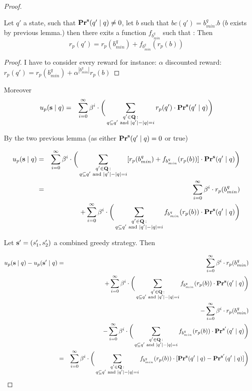 \begin{proof}
\begin{mylem}
	Let $q'$ a state, such that $\mathbf{Pr}^{\mathbf{s}}(q' \mid q) \neq 0$, let $b$ such that $bc(q') = b^q_{min}.b$ ($b$ exists by previous lemma.) then there exits a function $f_{b^q_{min}}$ such that :
	Then  $$r_p(q') = r_p(b^q_{min}) + f_{b^q_{min}}(r_p(b))$$
\end{mylem}
\begin{proof}
	I have to consider every reward for instance:  $\alpha$ discounted reward: 
	$r_p(q') = r_p(b^q_{min}) + \alpha^{|b^q_{min}|}r_p(b)$
\end{proof}

Moreover
\begin{eqnarray*}
	u_p(\mathbf{s} \mid q) & = & \sum_{i=0}^{\infty}\beta^{i} \cdot  \bigg(\sum_{\substack{q' \in \mathbf{Q} \,: \\ q \subseteq q' \text{ {\rm and} } |q'| - |q| = i}} r_p(q') \cdot 
	\mathbf{Pr}^{\mathbf{s}}(q' \mid q)\bigg)
\end{eqnarray*}

By the two previous lemma (as either $\mathbf{Pr}^{\mathbf{s}}(q' \mid q) = 0$ or true) 

\begin{eqnarray*}
	u_p(\mathbf{s} \mid q) & = & \sum_{i=0}^{\infty}\beta^{i} \cdot  \bigg(\sum_{\substack{q' \in \mathbf{Q} \,: \\ q \subseteq q' \text{ {\rm and} } |q'| - |q| = i}} [r_p(b^q_{min}) + f_{b^q_{min}}(r_p(b))] \cdot 
	\mathbf{Pr}^{\mathbf{s}}(q' \mid q)\bigg) \\ 
	& = & \sum_{i=0}^{\infty}\beta^{i} \cdot  r_p(b^q_{min})  \\ 
	&&+ \sum_{i=0}^{\infty}\beta^{i} \cdot  \bigg(\sum_{\substack{q' \in \mathbf{Q} \,: \\ q \subseteq q' \text{ {\rm and} } |q'| - |q| = i}}  f_{b^q_{min}}(r_p(b)) \cdot 
	\mathbf{Pr}^{\mathbf{s}}(q' \mid q)\bigg) \\ 
\end{eqnarray*}

Let $\mathbf{s}' = (s_1',s_2')$ a combined greedy strategy. 
Then 

\begin{eqnarray*}
	u_p(\mathbf{s} \mid q) - u_p(\mathbf{s}' \mid q)& = & \sum_{i=0}^{\infty}\beta^{i} \cdot  r_p(b^q_{min})  \\ 
	&&+ \sum_{i=0}^{\infty}\beta^{i} \cdot  \bigg(\sum_{\substack{q' \in \mathbf{Q} \,: \\ q \subseteq q' \text{ {\rm and} } |q'| - |q| = i}}  f_{b^q_{min}}(r_p(b)) \cdot 
	\mathbf{Pr}^{\mathbf{s}}(q' \mid q)\bigg) \\ 
	&& -  \sum_{i=0}^{\infty}\beta^{i} \cdot  r_p(b^q_{min})  \\ 
	&& - \sum_{i=0}^{\infty}\beta^{i} \cdot  \bigg(\sum_{\substack{q' \in \mathbf{Q} \,: \\ q \subseteq q' \text{ {\rm and} } |q'| - |q| = i}}  f_{b^q_{min}}(r_p(b)) \cdot 
	\mathbf{Pr}^{\mathbf{s}'}(q' \mid q)\bigg) \\ 	
	& = & \sum_{i=0}^{\infty}\beta^{i} \cdot  \bigg(\sum_{\substack{q' \in \mathbf{Q} \,: \\ q \subseteq q' \text{ {\rm and} } |q'| - |q| = i}} f_{b^q_{min}}(r_p(b)) \cdot 
	[\mathbf{Pr}^{\mathbf{s}}(q' \mid q)-\mathbf{Pr}^{\mathbf{s}'}(q' \mid q)]\bigg) \\
\end{eqnarray*}


\end{proof}
